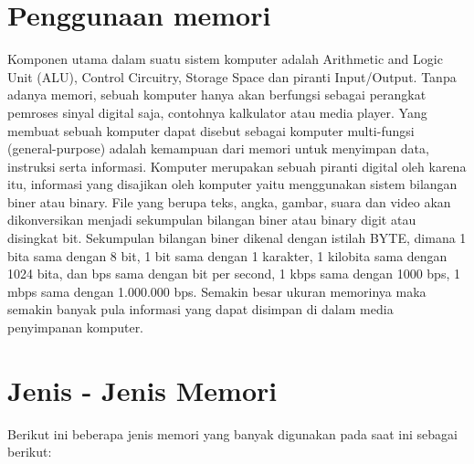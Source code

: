 \documentclass{article}
\begin{document}
\section{Penggunaan memori}
Komponen utama dalam suatu sistem komputer adalah Arithmetic and Logic Unit (ALU), Control Circuitry, Storage Space dan piranti Input/Output. Tanpa adanya memori, sebuah komputer hanya akan berfungsi sebagai perangkat pemroses sinyal digital saja, contohnya kalkulator atau media player. Yang membuat sebuah komputer dapat disebut sebagai komputer multi-fungsi (general-purpose)  adalah kemampuan  dari memori untuk menyimpan data, instruksi serta informasi. Komputer merupakan sebuah piranti digital oleh karena itu, informasi yang disajikan oleh komputer yaitu menggunakan sistem bilangan biner atau binary. File yang berupa teks, angka, gambar, suara dan video akan dikonversikan menjadi sekumpulan bilangan biner atau binary digit atau disingkat bit. Sekumpulan bilangan biner dikenal dengan istilah BYTE, dimana  1 bita sama dengan 8 bit, 1 bit sama dengan 1 karakter, 1 kilobita sama dengan 1024 bita, dan bps sama dengan bit per second, 1 kbps sama dengan 1000 bps, 1 mbps sama dengan 1.000.000 bps. Semakin besar ukuran memorinya maka semakin banyak pula informasi yang dapat disimpan di dalam media penyimpanan komputer.

\section{Jenis - Jenis Memori}
Berikut ini beberapa jenis memori yang banyak digunakan pada saat ini sebagai berikut:
\end{document}

